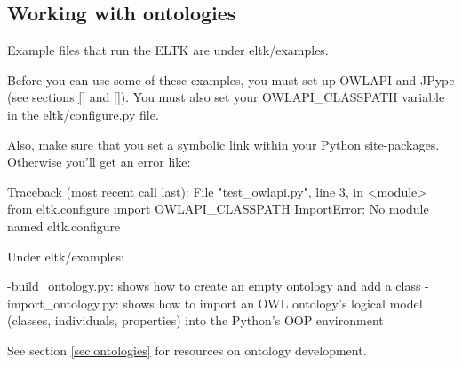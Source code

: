 \documentclass[]{article}
\begin{document}





\subsection{Working with ontologies}\label{sec:working_with_ontologies}
Example files that run the ELTK are under eltk/examples.

Before you can use some of these examples, you must set up OWLAPI and JPype (see sections \ref{} and \ref{}). You must also set your OWLAPI_CLASSPATH variable in the eltk/configure.py file. 

Also, make sure that you set a symbolic link within your Python site-packages. Otherwise you'll get an error like:

Traceback (most recent call last):
  File "test_owlapi.py", line 3, in <module>
    from eltk.configure import OWLAPI_CLASSPATH
ImportError: No module named eltk.configure





Under eltk/examples:

-build\_ontology.py: shows how to create an empty ontology and add a class 
-import\_ontology.py: shows how to import an OWL ontology's logical model (classes, individuals, properties) into the Python's OOP environment


See section \ref{sec:ontologies} for resources on ontology development.


\begin{comment}
-create a guide for working w. ontologies
        -loading
        -creating
        -creating classes and instantiating (a la owlapi website)
-create a guide for using owlapi, jpype in Py. (but don't spend a lot of time on this one)
\end{comment}
\end{document}
